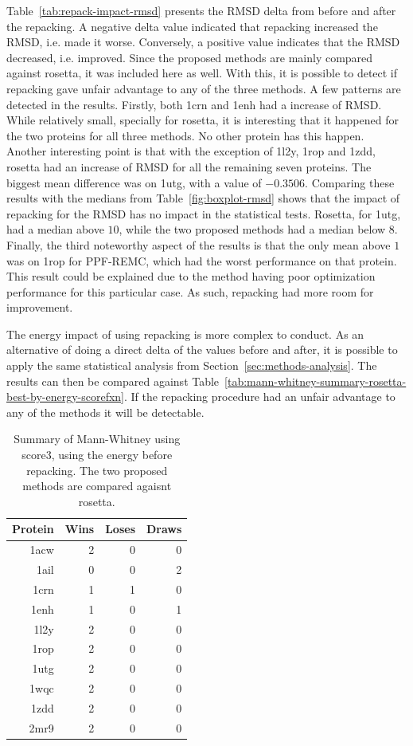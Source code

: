 Table~\ref{tab:repack-impact-rmsd} presents the RMSD delta from before and after
the repacking. A negative delta value indicated that repacking increased the RMSD,
i.e. made it worse. Conversely, a positive value indicates that the RMSD decreased,
i.e. improved.
Since the proposed methods are mainly compared against rosetta,
it was included here as well. With this, it is possible to detect if repacking
gave unfair advantage to any of the three methods. A few patterns are detected
in the results. Firstly, both 1crn and 1enh had a increase of RMSD. While
relatively small, specially for rosetta, it is interesting that it happened for
the two proteins for all three methods. No other protein has this happen.
Another interesting point is that with the exception of 1l2y, 1rop and 1zdd,
rosetta had an increase of RMSD for all the remaining seven proteins. The
biggest mean difference was on 1utg, with a value of $-0.3506$. Comparing these
results with the medians from Table~\ref{fig:boxplot-rmsd} shows that the
impact of repacking for the RMSD has no impact in the statistical tests. Rosetta,
for 1utg, had a median above $10$, while the two proposed methods had a median
below $8$. Finally, the third noteworthy aspect of the results is that the only
mean above $1$ was on 1rop for PPF-REMC, which had the worst performance
on that protein. This result could be explained due to the method having poor
optimization performance for this particular case. As such, repacking had more
room for improvement.

The energy impact of using repacking is more complex to conduct. As an
alternative of doing a direct delta of the values before and after, it is
possible to apply the same statistical analysis from
Section~\ref{sec:methods-analysis}. The results can then be compared
against Table~\ref{tab:mann-whitney-summary-rosetta-best-by-energy-scorefxn}.
If the repacking procedure had an unfair advantage to any of the methods
it will be detectable.

\begin{table}
  \centering
  \begin{tabular}{r|r|r|r}
  Protein & Wins & Loses & Draws \\ \hline \hline
   1acw &  2 &  0 &  0 \\ \hline
   1ail &  0 &  0 &  2 \\ \hline
   1crn &  1 &  1 &  0 \\ \hline
   1enh &  1 &  0 &  1 \\ \hline
   1l2y &  2 &  0 &  0 \\ \hline
   1rop &  2 &  0 &  0 \\ \hline
   1utg &  2 &  0 &  0 \\ \hline
   1wqc &  2 &  0 &  0 \\ \hline
   1zdd &  2 &  0 &  0 \\ \hline
   2mr9 &  2 &  0 &  0 \\ \hline
  \end{tabular}
  \caption{Summary of Mann-Whitney using score3, using the energy before repacking.
  The two proposed methods are compared agaisnt rosetta.}
  \label{tab:mann-whitney-summary-best-by-energy-score3}
\end{table}

